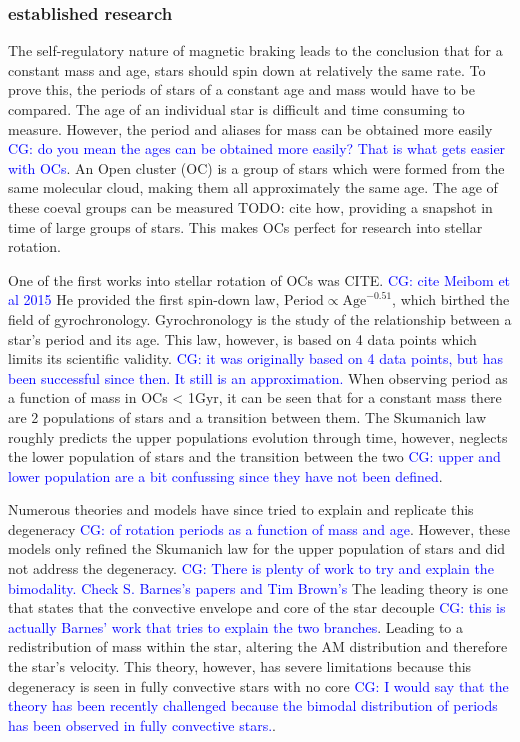\documentclass[fleqn,usenatbib]{mnras}
\begin{document}
\subsubsection{established research}
The self-regulatory nature of magnetic braking leads to the conclusion that for a constant mass and age, stars should spin down at relatively the same rate.
To prove this, the periods of stars of a constant age and mass would have to be compared.
The age of an individual star is difficult and time consuming to measure.
However, the period and aliases for mass can be obtained more easily \textcolor{blue}{CG: do you mean the ages can be obtained more easily? That is what gets easier with OCs}.
An Open cluster (OC) is a group of stars which were formed from the same molecular cloud, making them all approximately the same age.
The age of these coeval groups can be measured TODO: cite how, providing a snapshot in time of large groups of stars.
This makes OCs perfect for research into stellar rotation.

One of the first works into stellar rotation of OCs was CITE. \textcolor{blue}{CG: cite Meibom et al 2015}
He provided the first spin-down law,  $\text{Period} \propto \text{Age}^{-0.51}$, which birthed the field of gyrochronology.
Gyrochronology is the study of the relationship between a star's period and its age.
This law, however, is based on 4 data points which limits its scientific validity. \textcolor{blue}{CG: it was originally based on 4 data points, but has been successful since then. It still is an approximation.}
When observing period as a function of mass in OCs < 1Gyr,  it can be seen that for a constant mass there are 2 populations of stars and a transition between them. 
The Skumanich law roughly predicts the upper populations evolution through time, however, neglects the lower population of stars and the transition between the two \textcolor{blue}{CG: upper and lower population are a bit confussing since they have not been defined}.

Numerous theories and models have since tried to explain and replicate this degeneracy \textcolor{blue}{CG: of rotation periods as a function of mass and age}.
However, these models only refined the Skumanich law for the upper population of stars and did not address the degeneracy. \textcolor{blue}{CG: There is plenty of work to try and explain the bimodality. Check S. Barnes's papers and Tim Brown's}
The leading theory is one that states that the convective envelope and core of the star decouple \textcolor{blue}{CG: this is actually Barnes' work that tries to explain the two branches}.
Leading to a redistribution of mass within the star, altering the AM distribution and therefore the star’s velocity.
This theory, however, has severe limitations because this degeneracy is seen in fully convective stars with no core \textcolor{blue}{CG: I would say that the theory has been recently challenged because the bimodal distribution of periods has been observed in fully convective stars.}. 
\end{document}
